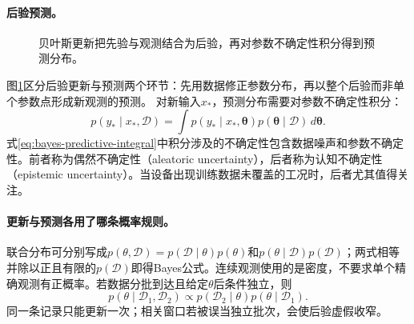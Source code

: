 \paragraph{后验预测。}
\begin{figure}[htbp]
\centering
{}
\caption{贝叶斯更新把先验与观测结合为后验，再对参数不确定性积分得到预测分布。}
\label{fig:bayes-predictive-flow}
\end{figure}
图\ref{fig:bayes-predictive-flow}区分后验更新与预测两个环节：先用数据修正参数分布，再以整个后验而非单个参数点形成新观测的预测。
对新输入$x_*$，预测分布需要对参数不确定性积分：
\begin{equation}
 p(y_*\mid x_*,\mathcal{D})=\int p(y_*\mid x_*,\bm{\theta})p(\bm{\theta}\mid\mathcal{D})\,d\bm{\theta}.\label{eq:bayes-predictive-integral}
\end{equation}
式\eqref{eq:bayes-predictive-integral}中积分涉及的不确定性包含数据噪声和参数不确定性。前者称为偶然不确定性（aleatoric uncertainty），后者称为认知不确定性（epistemic uncertainty）。当设备出现训练数据未覆盖的工况时，后者尤其值得关注。

\paragraph{更新与预测各用了哪条概率规则。}
联合分布可分别写成$p(\theta,\mathcal D)=p(\mathcal D\mid\theta)p(\theta)$和$p(\theta\mid\mathcal D)p(\mathcal D)$；两式相等并除以正且有限的$p(\mathcal D)$即得Bayes公式。连续观测使用的是密度，不要求单个精确观测有正概率。若数据分批到达且给定$\theta$后条件独立，则
\begin{equation}
 p(\theta\mid\mathcal D_1,\mathcal D_2)
 \propto p(\mathcal D_2\mid\theta)p(\theta\mid\mathcal D_1).
\end{equation}
同一条记录只能更新一次；相关窗口若被误当独立批次，会使后验虚假收窄。


